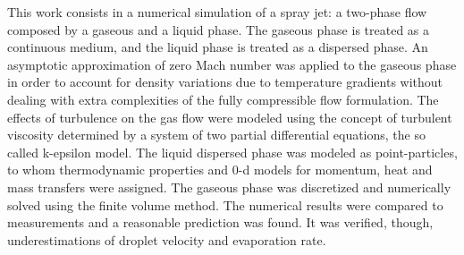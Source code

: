 
This work consists in a numerical simulation of a spray jet: a two-phase flow composed by a gaseous and a liquid phase. The gaseous phase is treated as a continuous medium, and the liquid phase is treated as a dispersed phase. An asymptotic approximation of zero Mach number was applied to the gaseous phase in order to account for density variations due to temperature gradients without dealing with extra complexities of the fully compressible flow formulation. The effects of turbulence on the gas flow were modeled using the concept of turbulent viscosity determined by a system of two partial differential equations, the so called k-epsilon model. The liquid dispersed phase was modeled as point-particles, to whom thermodynamic properties and 0-d models for momentum, heat and mass transfers were assigned. The gaseous phase was discretized and numerically solved using the finite volume method. The numerical results were compared to measurements and a reasonable prediction was found. It was verified, though, underestimations of droplet velocity and evaporation rate.
